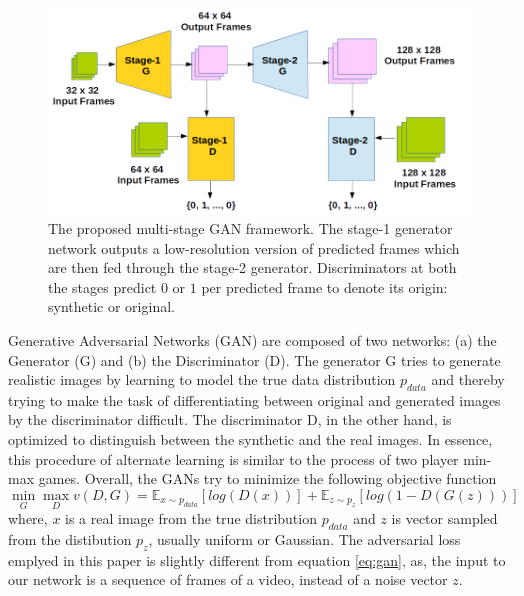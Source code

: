 \documentclass{article}
\DeclareMathOperator*{\undermax}{max}
\DeclareMathOperator*{\undermin}{min}
\begin{document}
  \begin{figure}[t]
  	\includegraphics[scale = 0.45]{Images/multi_gan.png}
  	\caption{The proposed multi-stage GAN framework. The stage-1 generator network outputs a low-resolution version of predicted frames which are then fed through the stage-2 generator. Discriminators at both the stages predict $ 0 $ or $ 1 $ per predicted frame to denote its origin: synthetic or original.}
  	\label{fig:gan}
  \end{figure}
  Generative Adversarial Networks (GAN) \cite{goodfellow2014generative} are composed of two networks: (a) the Generator (G) and (b) the Discriminator (D). The generator G tries to generate realistic images by learning to model the true data distribution $ p_{data} $ and thereby trying to make the task of differentiating between original and generated images by the discriminator difficult. The discriminator D, in the other hand, is optimized to distinguish between the synthetic and the real images. In essence, this procedure of alternate learning is similar to the process of two player min-max games. Overall, the GANs try to minimize the following objective function
  \begin{equation}
  	\undermin_G \undermax_D v(D, G) = \mathbb{E}_{x \sim p_{data}} [log (D(x))] + \mathbb{E}_{z \sim p_z} [log (1 - D(G(z)))]
  	\label{eq:gan}
  \end{equation}
  where, $ x $ is a real image from the true distribution $ p_{data} $ and $ z $ is vector sampled from the distibution $ p_z $, usually uniform or Gaussian. The adversarial loss emplyed in this paper is slightly different from equation \ref{eq:gan}, as, the input to our network is a sequence of frames of a video, instead of a noise vector $ z $. 
  
\end{document}
